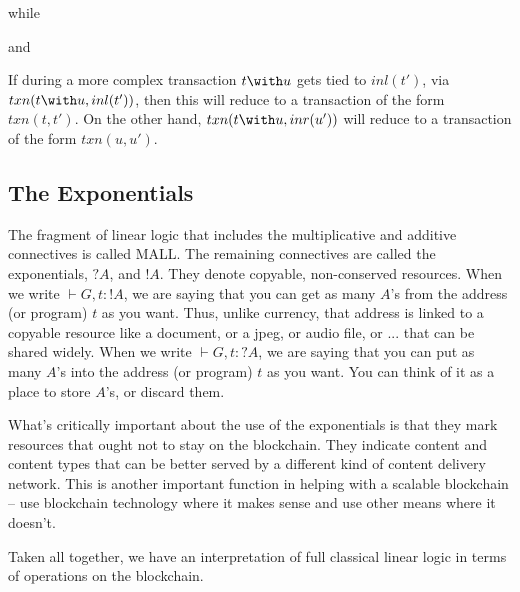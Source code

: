\documentclass[fleqn]{acm_proc_article-sp}
\numberwithin{equation}{subsection}
\begin{document}
\begin{mathpar}
\end{mathpar}

while 

\begin{mathpar}
\end{mathpar}

and

\begin{mathpar}
\end{mathpar}

If during a more complex transaction $t \with u$ gets tied to $inl( t'
)$, via $txn( t \with u, inl( t' ) )$, then this will reduce to a
transaction of the form $txn( t, t' )$. On the other hand, $txn( t
\with u, inr( u' ) )$ will reduce to a transaction of the form $txn(
u, u' )$.

\subsection{The Exponentials}

The fragment of linear logic that includes the multiplicative and
additive connectives is called MALL. The remaining connectives are
called the exponentials, $?A$, and $!A$. They denote copyable,
non-conserved resources. When we write $\vdash G, t : !A$, we are
saying that you can get as many $A$'s from the address (or program)
$t$ as you want. Thus, unlike currency, that address is linked to a
copyable resource like a document, or a jpeg, or audio file, or
... that can be shared widely. When we write $\vdash G, t : ?A$, we
are saying that you can put as many $A$'s into the address (or
program) $t$ as you want. You can think of it as a place to store
$A$'s, or discard them.

What's critically important about the use of the exponentials is that
they mark resources that ought not to stay on the blockchain. They
indicate content and content types that can be better served by a
different kind of content delivery network. This is another important
function in helping with a scalable blockchain -- use blockchain
technology where it makes sense and use other means where it doesn't.

Taken all together, we have an interpretation of full classical linear
logic in terms of operations on the blockchain.
\end{document}
